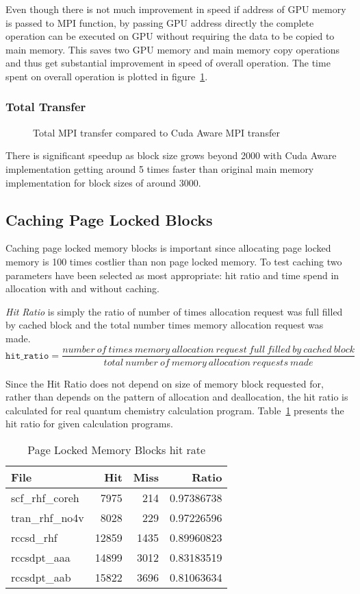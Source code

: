 Even though there is not much improvement in speed if address of GPU memory is
passed to MPI function, by passing GPU address directly the complete operation
can be executed on GPU without requiring the data to be copied to main memory. This
saves two GPU memory and main memory copy operations and thus get substantial improvement
in speed of overall operation. The time spent on overall operation is plotted in
figure~\ref{fig:mempin_rdma_total}.

\subsubsection{Total Transfer}
\begin{figure}[h]
  
  \caption{Total MPI transfer compared to Cuda Aware MPI transfer}
  \label{fig:mempin_rdma_total}
\end{figure}

There is significant speedup as block size grows beyond 2000 with Cuda Aware
implementation getting around 5 times faster than original main memory implementation
for block sizes of around 3000.

\subsection{Caching Page Locked Blocks}
Caching page locked memory blocks is important since allocating page locked memory
is 100 times costlier than non page locked memory. To test caching two parameters
have been selected as most appropriate: hit ratio and time spend in allocation with
and without caching.

\textit{Hit Ratio} is simply the ratio of number of times allocation request was
full filled by cached block and the total number times memory allocation request
was made.
\[
  \texttt{hit\_ratio} = \frac{number~of~times~memory~allocation~request~full~filled~by~cached~block}{total~number~of~memory~allocation~requests~made}
\]

Since the Hit Ratio does not depend on size of memory block requested for, rather
than depends on the pattern of allocation and deallocation, the hit ratio is calculated
for real quantum chemistry calculation program. Table~\ref{tab:mempin_hitrate}
presents the hit ratio for given calculation programs.

\begin{table}[h]
  \centering
  \begin{tabular}{l | r | r | r}
    \hline
    File            & Hit   & Miss & Ratio      \\
    \hline
    scf\_rhf\_coreh &  7975 &  214 & 0.97386738 \\
    tran\_rhf\_no4v &  8028 &  229 & 0.97226596 \\
    rccsd\_rhf      & 12859 & 1435 & 0.89960823 \\
    rccsdpt\_aaa    & 14899 & 3012 & 0.83183519 \\
    rccsdpt\_aab    & 15822 & 3696 & 0.81063634 \\
    \hline
  \end{tabular}
  \caption{Page Locked Memory Blocks hit rate}
  \label{tab:mempin_hitrate}
\end{table}

